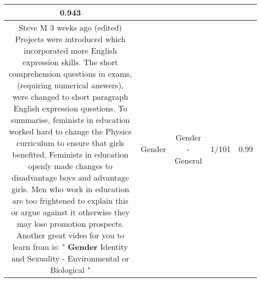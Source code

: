 \documentclass[11pt]{article}
\newlength\mylength
\begin{document}
\begin{center}
\begin{longtable}{|C{.65\mylength}|C{.30\mylength}|C{.12\mylength}|C{.12\mylength}|C{.12\mylength}|}
0.943 \\  \hline
  \small Steve M 3 weeks ago (edited) Projects were introduced which incorporated more English expression skills. The short comprehension questions in exams, (requiring numerical answers), were changed to short paragraph English expression questions. To summarise, feminists in education worked hard to change the Physics curriculum to ensure that girls benefited. Feminists in education openly made changes to disadvantage boys and advantage girls. Men who work in education are too frightened to explain this or argue against it otherwise they may lose promotion prospects. Another great video for you to learn from is: " \textbf{Gender} Identity and Sexuality - Environmental or Biological "\normalsize   & Gender & Gender - General & 1/101 & 0.99 \\  \hline

\end{longtable}
\end{center}
\end{document}

